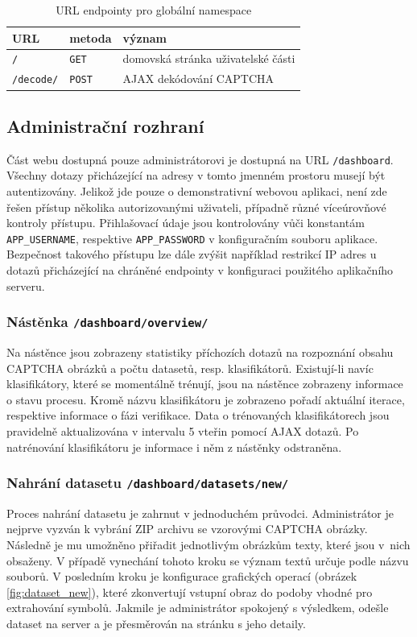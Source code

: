 \documentclass[
  field=ainfp,
  master=true,
  biblatex,
  sourcecodes=false,
  theorems=false,
  glossaries,
  index
]{kidiplom}
\begin{document}
\begin{table}[H]
\centering
\begin{tabular}{|l|l|l|}
\hline
\textbf{URL} & \textbf{metoda} & \textbf{význam}
\\ \hline
\texttt{/} & \texttt{GET} & domovská stránka uživatelské části
\\ \hline
\texttt{/decode/} & \texttt{POST} & AJAX dekódování CAPTCHA
\\ \hline
\end{tabular}
\caption{URL endpointy pro globální namespace}
\end{table}

\subsection{Administrační rozhraní}
Část webu dostupná pouze administrátorovi je dostupná na URL \texttt{/dashboard}. Všechny dotazy přicházející na adresy v tomto jmenném prostoru musejí být autentizovány. Jelikož jde pouze o demonstrativní webovou aplikaci, není zde řešen přístup několika autorizovanými uživateli, případně různé víceúrovňové kontroly přístupu. Přihlašovací údaje jsou kontrolovány vůči konstantám \texttt{APP\_USERNAME}, respektive \texttt{APP\_PASSWORD} v konfiguračním souboru aplikace. Bezpečnost ta\-ko\-vého přístupu lze dále zvýšit například restrikcí IP adres u dotazů přicházející na chráněné endpointy v konfiguraci použitého aplikačního serveru.

\subsubsection*{Nástěnka \texttt{/dashboard/overview/}}
 Na nástěnce jsou zobrazeny statistiky příchozích dotazů na rozpoznání obsahu CAPTCHA obrázků a počtu datasetů, resp. klasifikátorů. Existují-li navíc klasifikátory, které se momentálně trénují, jsou na nástěnce zobrazeny informace o stavu procesu. Kromě názvu klasifikátoru je zobrazeno pořadí aktuální iterace, respektive informace o fázi verifikace. Data o trénovaných klasifikátorech jsou pravidelně aktualizována v intervalu 5 vteřin pomocí AJAX dotazů. Po natrénování klasifikátoru je informace i něm z nástěnky odstraněna.

\subsubsection*{Nahrání datasetu \texttt{/dashboard/datasets/new/}}
Proces nahrání datasetu je zahrnut v jednoduchém průvodci. Administrátor je nejprve vyzván k vybrání ZIP archivu se vzorovými CAPTCHA obrázky. Následně je mu umožněno přiřadit jednotlivým obrázkům texty, které jsou v~nich obsaženy. V případě vynechání tohoto kroku se význam textů určuje podle názvu souborů. V posledním kroku je konfigurace grafických operací (obrázek \ref{fig:dataset_new}), které zkonvertují vstupní obraz do podoby vhodné pro extrahování symbolů. Jakmile je administrátor spokojený s výsledkem, odešle dataset na server a je přesměrován na stránku s jeho detaily.
\end{document}

